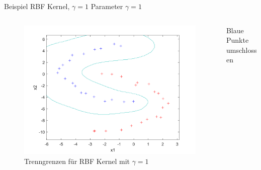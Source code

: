 \documentclass[ngerman]{beamer}
\begin{document}
\begin{frame}{Beispiel RBF Kernel, $\gamma=1$}
    Parameter $\gamma=1$ \\ \pause
    \begin{columns}
        \begin{column}{0.8\textwidth}
        \begin{figure}
            \includegraphics[width=\textwidth,height=0.7\textheight,keepaspectratio]{../code/octave/images/sgdrbfkernel}
            \caption{Trenngrenzen für RBF Kernel mit $\gamma=1$}
            \label{fig:bsprbfkernel}
        \end{figure}
    \end{column} \pause
        \begin{column}{0.2\textwidth}
    Blaue Punkte umschlossen
            \end{column}
        \end{columns}
\end{frame}
\end{document}
